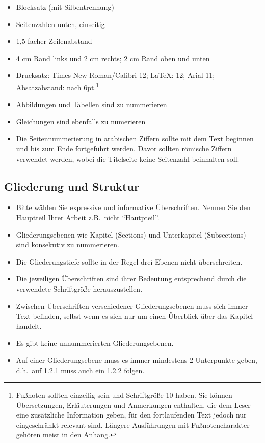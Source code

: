 \documentclass[a4paper,12pt]{scrartcl} %
\begin{document}
\begin{itemize}
\item Blocksatz (mit Silbentrennung)
\item Seitenzahlen unten, einseitig
\item 1,5-facher Zeilenabstand
\item 4 cm Rand links und 2 cm rechts; 2 cm Rand oben und unten
\item Drucksatz: Times New Roman/Calibri 12; \LaTeX: 12; Arial 11; Absatzabstand:
nach 6pt.\footnote{Fußnoten sollten einzeilig sein und Schriftgröße 10 haben. Sie können Übersetzungen, Erläuterungen und Anmerkungen enthalten, die dem Leser eine zusätzliche Information geben, für den fortlaufenden Text jedoch nur eingeschränkt relevant sind. Längere Ausführungen mit Fußnotencharakter gehören meist in den Anhang.}
\item Abbildungen und Tabellen sind zu nummerieren
\item Gleichungen sind ebenfalls zu numerieren
\item Die Seitennummerierung in arabischen Ziffern sollte mit dem Text beginnen und bis zum Ende fortgeführt werden. Davor sollten römische Ziffern verwendet werden, wobei die Titelseite keine Seitenzahl beinhalten soll.
\end{itemize}

\subsection{Gliederung und Struktur}

\begin{itemize}
   \item Bitte wählen Sie expressive und informative Überschriften. Nennen Sie den Hauptteil Ihrer Arbeit z.B.\ nicht ``Hautpteil''.
   \item Gliederungsebenen wie Kapitel (Sections) und Unterkapitel (Subsections) sind konsekutiv zu nummerieren.
   \item Die Gliederungstiefe sollte in der Regel drei Ebenen nicht überschreiten.
   \item Die jeweiligen Überschriften sind ihrer Bedeutung entsprechend durch die verwendete Schriftgröße herauszustellen.
   \item Zwischen Überschriften verschiedener Gliederungsebenen muss sich immer Text befinden, selbst wenn es sich nur um einen Überblick über das Kapitel handelt.
   \item Es gibt keine unnummerierten Gliederungsebenen.
   \item Auf einer Gliederungsebene muss es immer mindestens 2 Unterpunkte geben, d.h.\ auf 1.2.1 muss auch ein 1.2.2 folgen.
 \end{itemize}
\end{document}
